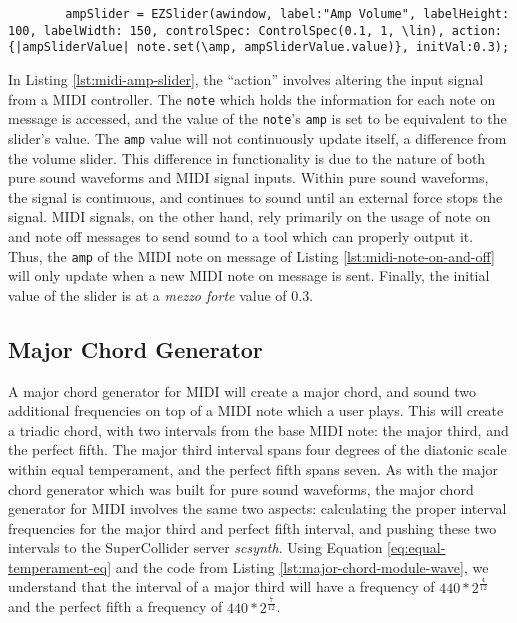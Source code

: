 \begin{listing}
	\begin{lstlisting}
		ampSlider = EZSlider(awindow, label:"Amp Volume", labelHeight: 100, labelWidth: 150, controlSpec: ControlSpec(0.1, 1, \lin), action:{|ampSliderValue| note.set(\amp, ampSliderValue.value)}, initVal:0.3);
	\end{lstlisting}	
	\caption{Creating the amp slider for MIDI}
	\label{lst:midi-amp-slider}
\end{listing}

In Listing \ref{lst:midi-amp-slider}, the ``action'' involves altering the input signal from a MIDI controller. The \texttt{note} which holds the information for each note on message is accessed, and the value of the \texttt{note}'s \texttt{amp} is set to be equivalent to the slider's value. The \texttt{amp} value will not continuously update itself, a difference from the volume slider. This difference in functionality is due to the nature of both pure sound waveforms and MIDI signal inputs. Within pure sound waveforms, the signal is continuous, and continues to sound until an external force stops the signal. MIDI signals, on the other hand, rely primarily on the usage of note on and note off messages to send sound to a tool which can properly output it. Thus, the \texttt{amp} of the MIDI note on message of Listing \ref{lst:midi-note-on-and-off} will only update when a new MIDI note on message is sent. Finally, the initial value of the slider is at a \textit{mezzo forte} value of 0.3.

\subsection{Major Chord Generator}

A major chord generator for MIDI will create a major chord, and sound two additional frequencies on top of a MIDI note which a user plays. This will create a triadic chord, with two intervals from the base MIDI note: the major third, and the perfect fifth. The major third interval spans four degrees of the diatonic scale within equal temperament, and the perfect fifth spans seven. As with the major chord generator which was built for pure sound waveforms, the major chord generator for MIDI involves the same two aspects: calculating the proper interval frequencies for the major third and perfect fifth interval, and pushing these two intervals to the SuperCollider server \textit{scsynth}. Using Equation \ref{eq:equal-temperament-eq} and the code from Listing \ref{lst:major-chord-module-wave}, we understand that the interval of a major third will have a frequency of $440 * 2^\frac{4}{12}$ and the perfect fifth a frequency of $440 * 2^\frac{7}{12}$.

